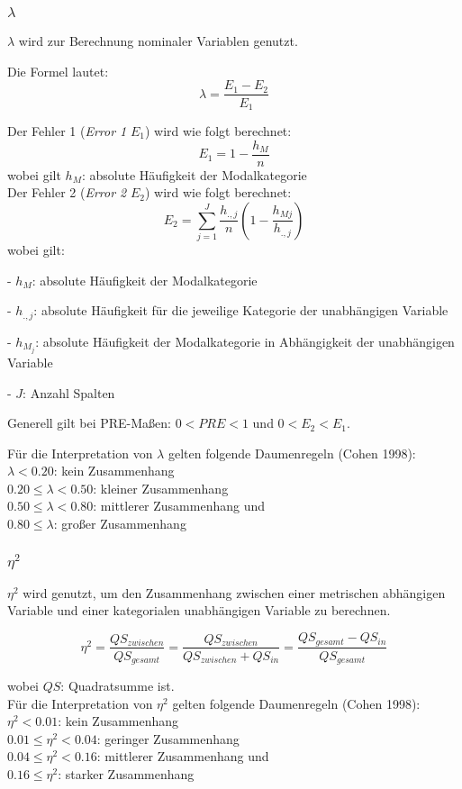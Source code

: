 \documentclass[11pt,a4paper]{article}
\begin{document}
\subsubsection{\texorpdfstring{$\lambda$}{Lambda}}
$\lambda$ wird zur Berechnung nominaler Variablen genutzt.

Die Formel lautet:
$$\lambda = \frac{E_1 - E_2}{E_1}$$

Der Fehler 1 (\textit{Error 1} $E_1$) wird wie folgt berechnet:
$$E_1 = 1 - \frac{h_{M}}{n}$$
wobei gilt $h_{M}$: absolute Häufigkeit der Modalkategorie \\

Der Fehler 2 (\textit{Error 2} $E_2$) wird wie folgt berechnet:
$$E_2 = \sum_{j=1}^J \frac{h_{.,j}}{n} (1- \frac{h_{Mj}}{h_{.,j}})$$
wobei gilt:

- $h_{M}$: absolute Häufigkeit der Modalkategorie

- $h_{.,j}$: absolute Häufigkeit für die jeweilige Kategorie der unabhängigen Variable

- $h_{M_j}$: absolute Häufigkeit der Modalkategorie in Abhängigkeit der unabhängigen Variable

- $J$: Anzahl Spalten

Generell gilt bei PRE-Maßen: $0 < PRE < 1$ und $0 < E_2 < E_1$.

Für die Interpretation von $\lambda$ gelten folgende Daumenregeln (Cohen 1998): \\
$\lambda < 0.20$: kein Zusammenhang\\
$0.20 \leq \lambda < 0.50$: kleiner Zusammenhang \\
$0.50 \leq \lambda < 0.80$: mittlerer Zusammenhang und\\
$0.80 \leq \lambda$: großer Zusammenhang\\

\subsubsection{\texorpdfstring{$\eta^2$}{Eta-Quadrat}}
$\eta^2$ wird genutzt, um den Zusammenhang zwischen einer metrischen abhängigen Variable und einer kategorialen unabhängigen Variable zu berechnen. 

$$\eta^2 = \frac {QS_{zwischen}}{QS_{gesamt}}= \frac{QS_{zwischen}}{QS_{zwischen} + QS_{in}} = \frac {QS_{gesamt} - QS_{in}}{QS_{gesamt}}$$

wobei $QS$: Quadratsumme ist.\\

Für die Interpretation von $\eta^2$ gelten folgende Daumenregeln (Cohen 1998): \\
$\eta^2 < 0.01$: kein Zusammenhang\\
$0.01 \leq \eta^2 < 0.04$: geringer Zusammenhang \\
$0.04 \leq \eta^2 < 0.16$: mittlerer Zusammenhang und\\
$0.16 \leq \eta^2$: starker Zusammenhang\\
\end{document}
